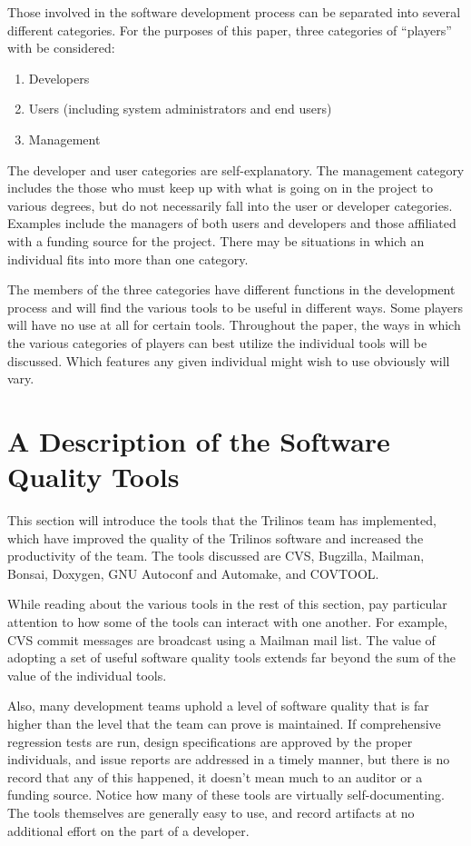 \documentclass[12pt,relax]{article}
\begin{document}
Those involved in the software development process can be separated into 
several different categories.  For the purposes of this paper, three 
categories of ``players'' with be considered: 
\begin{enumerate}
\item Developers
\item Users (including system administrators and end users)
\item Management
\end{enumerate}

The developer and user 
categories are self-explanatory.  The management category includes the those 
who must keep up with what is going on in the project to various degrees, but 
do not necessarily fall into the user or developer categories.  
Examples include the managers of both users and developers and those 
affiliated with a funding source for the project.  There may be situations 
in which an individual fits into more than one category.

The members of the three categories have different functions in the 
development process and will find the various tools to be useful 
in different ways.  Some players will have no use at all for certain tools.
Throughout the paper, the ways in which the various categories of players 
can best utilize the individual tools will be discussed.  Which features any 
given individual might wish to use obviously will vary.

\section{A Description of the Software Quality Tools}
\label{Section:CommunicationTools}

This section will introduce the tools that the Trilinos team has implemented, 
which have improved the quality of the Trilinos software and increased the 
productivity of the team.  The tools discussed are CVS, Bugzilla, Mailman, 
Bonsai, Doxygen, GNU Autoconf and Automake, and COVTOOL.

While reading about the various tools in the rest of this section, pay 
particular attention to how some of the tools can interact with one another.
For example, CVS commit messages are broadcast using a Mailman mail list.
The value of adopting a set of useful software quality tools extends far 
beyond the sum of the value of the individual tools.

Also, many development teams uphold a level of software quality that is far 
higher than the level that the team can prove is maintained.  If comprehensive
regression tests are run, design specifications are approved by the 
proper individuals, and issue reports are addressed in a timely manner, but 
there is no record that any of this happened, it doesn't mean much to an 
auditor or a funding source.  Notice how many of these tools are virtually
self-documenting.  The tools themselves are generally easy to use, and 
record artifacts at no additional effort on the part of a developer.  
\end{document}
